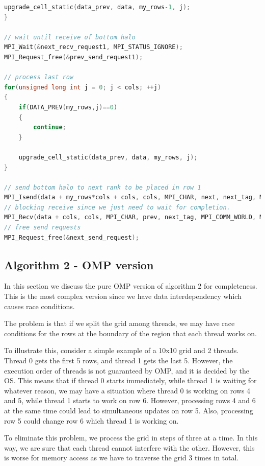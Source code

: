 \documentclass{report}
\begin{document}
\begin{lstlisting}[language=C++]
    upgrade_cell_static(data_prev, data, my_rows-1, j);
}

// wait until receive of bottom halo
MPI_Wait(&next_recv_request1, MPI_STATUS_IGNORE);
MPI_Request_free(&prev_send_request1);

// process last row
for(unsigned long int j = 0; j < cols; ++j)
{
    if(DATA_PREV(my_rows,j)==0)
    {
        continue;
    }

    upgrade_cell_static(data_prev, data, my_rows, j);
}

// send bottom halo to next rank to be placed in row 1
MPI_Isend(data + my_rows*cols + cols, cols, MPI_CHAR, next, next_tag, MPI_COMM_WORLD, &next_send_request);
// blocking receive since we just need to wait for completion.
MPI_Recv(data + cols, cols, MPI_CHAR, prev, next_tag, MPI_COMM_WORLD, MPI_STATUS_IGNORE);
// free send requests
MPI_Request_free(&next_send_request);
\end{lstlisting}

\subsection{Algorithm 2 - OMP version}

In this section we discuss the pure OMP version of algorithm 2 for completeness.
This is the most complex version since we have data interdependency which 
causes race conditions. 

The problem is that if we split the grid among threads, we may have race conditions 
for the rows at the boundary of the region that each thread works on.

To illustrate this, consider a simple example of a 10x10 grid and 2 threads. 
Thread 0 gets the first 5 rows, and thread 1 gets the last 5. However, the execution 
order of threads is not guaranteed by OMP, and it is decided by the OS. This means 
that if thread 0 starts immediately, while thread 1 is waiting for whatever reason, 
we may have a situation where thread 0 is working on rows 4 and 5, while thread 1 
starts to work on row 6. However, processing rows 4 and 6 at the same time could 
lead to simultaneous updates on row 5. Also, processing row 5 could change row 6 
which thread 1 is working on. 

To eliminate this problem, we process the grid in steps of three at a time. 
In this way, we are sure that each thread cannot interfere with the other. However, 
this is worse for memory access as we have to traverse the grid 3 times in 
total.
\end{document}
